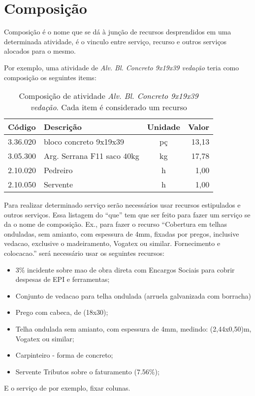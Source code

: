 \chapter{Composição}

Composição é o nome que se dá à junção de recursos desprendidos em uma determinada atividade, é o vinculo entre serviço, recurso e outros serviços alocados para o mesmo.

Por exemplo, uma atividade de \emph{Alv. Bl. Concreto 9x19x39 vedação} teria como composição os seguintes items:

\begin{table}[h]
	\centering
	\begin{tabular}{|l|l|c|r|}
	\hline
	Código&			Descrição&						Unidade&		Valor 	\\ \hline
	3.36.020&		bloco concreto 9x19x39&			pç&				13,13	\\ \hline
	3.05.300&		Arg. Serrana F11 saco 40kg&		kg&				17,78	\\ \hline
	2.10.020&		Pedreiro&						h&				 1,00	\\ \hline
	2.10.050&		Servente&						h&				 1,00	\\ \hline
	\end{tabular}
	\caption{Composição de atividade \emph{Alv. Bl. Concreto 9x19x39 vedação}. Cada item é considerado um recurso}
	\label{tab:composicao}
\end{table}

Para realizar determinado serviço serão necessários usar recursos estipulados e outros serviços. Essa listagem do ``que'' tem que ser feito para fazer um serviço se da o nome de composição. Ex., para fazer o recurso ``Cobertura em telhas onduladas, sem amianto, com espessura de 4mm, fixadas por pregos, inclusive vedacao, exclusive o madeiramento, Vogatex ou similar. Fornecimento e colocacao.'' será necessário usar os seguintes recursos:

\begin{itemize}
	\item 3\% incidente sobre mao de obra direta com Encargos Sociais para cobrir despesas de EPI e ferramentas;
	\item Conjunto de vedacao para telha ondulada (arruela galvanizada com borracha)
	\item Prego com cabeca, de (18x30);
	\item Telha ondulada sem amianto, com espessura de 4mm, medindo: (2,44x0,50)m, Vogatex ou similar;
	\item Carpinteiro - forma de concreto;
	\item Servente Tributos sobre o faturamento (7.56\%);
\end{itemize}

E o serviço de por exemplo, fixar colunas.